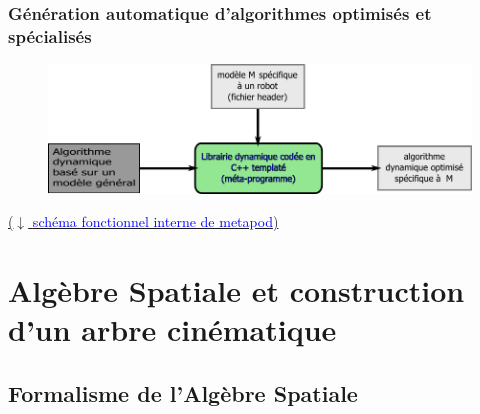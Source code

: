 \documentclass[10pt]{beamer}
\begin{document}
\begin{frame}
  \frametitle{Génération automatique d'algorithmes optimisés et spécialisés}
  
	\begin{figure}[H]
	\begin{center}
	\includegraphics[width=\textwidth]{figs/principeAlgoGenerique.pdf}
	\label{fig_generationAlgoAutomatique}
	\end{center}
	\end{figure}
  
	
	\bigskip
	\href{run:/home/nuno/Documents/Stage/Soutenance/figs/archiMetapod.pdf}
	{($\downarrow$ \textcolor{blue}{schéma fonctionnel interne de metapod})}

\end{frame}


\section{Algèbre Spatiale et construction d'un arbre cinématique}

\subsection{Formalisme de l'Algèbre Spatiale}
\end{document}
